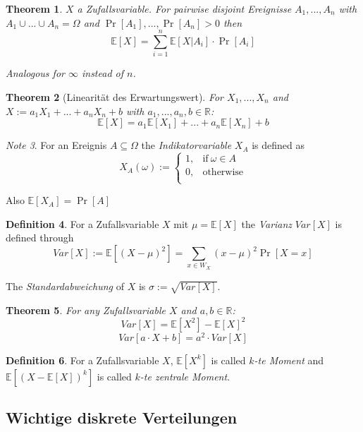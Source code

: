 \documentclass[12pt]{extarticle}
\theoremstyle{definition}
\newtheorem{definition}{Definition}[section]
\theoremstyle{remark}
\newtheorem{note}[definition]{Note}
\theoremstyle{plain}
\newtheorem{theorem}[definition]{Theorem}
\theoremstyle{plain}
\theoremstyle{plain}
\newcommand{\E}{\mathbb{E}}
\begin{document}
\begin{theorem}
    $X$ a Zufallsvariable. For pairwise disjoint Ereignisse $A_1, ..., A_n$ with $A_1 \cup ... \cup A_n = \Omega$ and
    $\Pr[A_1],...,\Pr[A_n] > 0$ then
    \[ \E[X] = \sum_{i=1}^n \E[X | A_i] \cdot \Pr[A_i] \]

    Analogous for $\infty$ instead of $n$.
\end{theorem}

\begin{theorem}[Linearität des Erwartungswert]
    For $X_1, ..., X_n$ and $X := a_1 X_1 + ... + a_n X_n + b$ with $a_1, ..., a_n, b \in \mathbb{R}$:
    \[ \E[X] = a_1 \E[X_1] + ... + a_n \E[X_n] + b \]
\end{theorem}

\begin{note}
    For an Ereignis $A \subseteq \Omega$ the \textit{Indikatorvariable} $X_A$ is defined as
    \[ X_A(\omega) := \begin{cases}
            1, & \mbox{if}\ \omega \in A \\
            0, & \mbox{otherwise}        \\
        \end{cases} \]

    Also $\E[X_A] = \Pr[A]$
\end{note}

\begin{definition}
    For a Zufallsvariable $X$ mit $\mu = \E[X]$ the \textit{Varianz} $Var[X]$ is defined through
    \[ Var[X] := \E[(X - \mu)^2] = \sum_{x \in W_X} (x - \mu)^2 \Pr[X = x] \]

    The \textit{Standardabweichung} of $X$ is $\sigma := \sqrt{Var[X]}$.
\end{definition}

\begin{theorem}
    For any Zufallsvariable $X$ and $a,b \in \mathbb{R}$:
    \[ Var[X] = \E[X^2] - \E[X]^2 \]
    \[ Var[a \cdot X + b] = a^2 \cdot Var[X] \]
\end{theorem}

\begin{definition}
    For a Zufallsvariable $X$, $\E[X^k]$ is called \textit{$k$-te Moment} and
    $\E[(X - \E[X])^k]$ is called \textit{$k$-te zentrale Moment}.
\end{definition}

\subsection{Wichtige diskrete Verteilungen}
\end{document}
